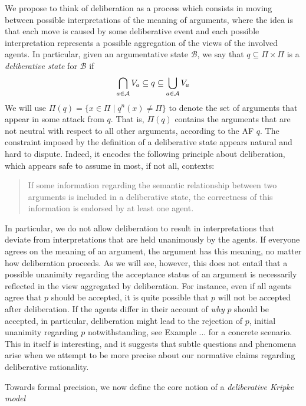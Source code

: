 \documentclass{article}
\newcommand{\neu}[2]{#1^n(#2)}
\newcommand{\views}{\mathcal B}
\begin{document}
We propose to think of deliberation as a process which consists in moving between possible interpretations of the meaning of arguments, where the idea is that each move is caused by some deliberative event and each possible interpretation represents a possible aggregation of the views of the involved agents. In particular, given an argumentative state $\views$, we say that $q \subseteq \Pi \times \Pi$ is a \emph{deliberative state} for $\views$ if
\begin{equation}\label{eq:ds}
\bigcap_{a \in \mathcal A}V_a \subseteq q \subseteq \bigcup_{a \in \mathcal A}V_a
\end{equation}
We will use $\Pi(q) = \{x \in \Pi \mid \neu q x \not = \Pi\}$ to denote the set of arguments that appear in some attack from $q$. That is, $\Pi(q)$ contains the arguments that are not neutral with respect to all other arguments, according to the AF $q$. The constraint imposed by the definition of a deliberative state appears natural and hard to dispute. Indeed, it encodes the following principle about deliberation, which appears safe to assume in most, if not all, contexts:

\begin{quote}\label{principle}
If some information regarding the semantic relationship between two arguments is included in a deliberative state, the correctness of this information is endorsed by at least one agent. 
\end{quote}

In particular, we do not allow deliberation to result in interpretations that deviate from interpretations that are held unanimously by the agents. If everyone agrees on the meaning of an argument, the argument has this meaning, no matter how deliberation proceeds. As we will see, however, this does not entail that a possible  unanimity regarding the acceptance status of an argument is necessarily reflected in the view aggregated by deliberation. For instance, even if all agents agree that $p$ should be accepted, it is quite possible that $p$ will not be accepted after deliberation. If the agents differ in their account of \emph{why} $p$ should be accepted, in particular, deliberation might lead to the rejection of $p$, initial unanimity regarding $p$ notwithstanding, see Example ... for a concrete scenario. This in itself is interesting, and it suggests that subtle questions and phenomena arise when we attempt to be more precise about our normative claims regarding deliberative rationality.

Towards formal precision, we now define the core notion of a \emph{deliberative Kripke model}
\end{document}
